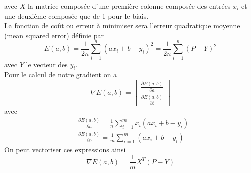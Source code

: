     avec $X$ la matrice composée d'une première colonne composée des entrées $x_i$ et une deuxième composée que de 1 pour le biais.\\
    La fonction de coût ou erreur  à minimiser sera l'erreur quadratique moyenne (mean squared error) définie par
    $$
    E(a,b) = \frac{1}{2n}\sum^n_{i=1}(ax_i+b-y_i)^2 =\frac{1}{2n}\sum^n_{i=1}(P-Y)^2
    $$
    avec $Y$ le vecteur des $y_i$. \\
    Pour le calcul de notre gradient on a 
    $$
    \nabla E (a,b)= \begin{bmatrix}
        \frac{\partial E(a,b)}{\partial a}\\\frac{\partial E(a,b)}{\partial b}
    \end{bmatrix}
    $$
    avec 
    \begin{align*}
        &\frac{\partial E(a,b)}{\partial a} = \frac{1}{n}\sum^m_{i=1}x_i(ax_i+b-y_i)\\
        &\frac{\partial E(a,b)}{\partial b} = \frac{1}{m}\sum^m_{i=1}(ax_i+b-y_i)
    \end{align*}
    On peut vectoriser ces expressions ainsi
    $$
    \nabla E(a,b) = \frac{1}{m} X^T(P-Y)
    $$


